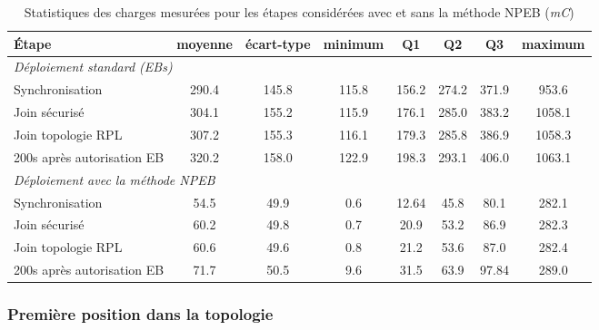 \documentclass[]{report}
\begin{document}
\begin{table}[h]
\centering
\begin{tabular}{|l|c|c|c|c|c|c|c|}
	\hline
    \textbf{\textbf{Étape}} & moyenne & écart-type & minimum & Q1 & Q2 & Q3 & maximum\\
    \hline
    \multicolumn{8}{|l|}{\textit{Déploiement standard (EBs)}}\\  
    \hline
    Synchronisation & 290.4 & 145.8 & 115.8 & 156.2 & 274.2 & 371.9 & 953.6\\
    \hline
    Join sécurisé & 304.1 & 155.2 & 115.9 & 176.1 & 285.0 & 383.2 & 1058.1 \\
    \hline
    Join topologie RPL & 307.2 & 155.3 & 116.1 & 179.3 & 285.8 & 386.9 & 1058.3 \\
    \hline
    200s après autorisation EB & 320.2 & 158.0 & 122.9 & 198.3 & 293.1 & 406.0 & 1063.1 \\
    \hline
    \multicolumn{8}{|l|}{\textit{Déploiement avec la méthode NPEB}}\\    
    \hline
    Synchronisation & 54.5 & 49.9 & 0.6 & 12.64 & 45.8 & 80.1 & 282.1 \\
    \hline
    Join sécurisé & 60.2 & 49.8 & 0.7 & 20.9 & 53.2 & 86.9 & 282.3 \\
    \hline
    Join topologie RPL & 60.6 & 49.6 & 0.8 & 21.2 & 53.6 & 87.0 & 282.4 \\
    \hline
    200s après autorisation EB & 71.7 & 50.5 & 9.6 & 31.5 & 63.9 & 97.84 & 289.0 \\
    \hline
\end{tabular}
\caption{Statistiques des charges mesurées pour les étapes considérées avec et sans la méthode NPEB (\textit{mC})}
\label{table_charges}
\end{table}

\subsubsection{Première position dans la topologie}
\end{document}
